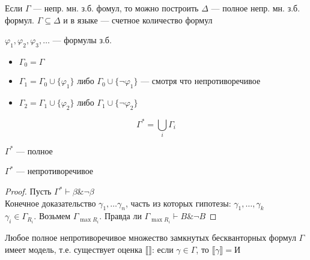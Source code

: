 \documentclass[english]{article}
\begin{document}
\begin{theorem}
	Если \(\Gamma\) --- непр. мн. з.б. фомул, то можно построить \(\Delta\) --- полное непр. мн. з.б. формул. \(\Gamma \subseteq \Delta\) и в языке --- счетное количество формул
	\label{orga418732}
\end{theorem}
\begin{definition}
	\(\varphi_1, \varphi_2, \varphi_3, \dots\) --- формулы з.б. \\
	\begin{itemize}
		\item \(\Gamma_0 = \Gamma\)
		\item \(\Gamma_1 = \Gamma_0 \cup \{\varphi_1\}\) либо \(\Gamma_0 \cup \{\neg \varphi_1\}\) --- смотря что непротиворечивое
		\item \(\Gamma_2 = \Gamma_1 \cup \{\varphi_2\}\) либо \(\Gamma_1 \cup \{\neg \varphi_2\}\)
	\end{itemize}
	\[ \Gamma^* = \bigcup_i \Gamma_i \]
	\label{orgf60f9ad}
\end{definition}
\begin{property}
	\(\Gamma^*\) --- полное
	\label{orgdaeaa27}
\end{property}
\begin{property}
	\(\Gamma^*\) --- непротиворечивое
	\label{org362707c}
\end{property}
\begin{proof}
	Пусть \(\Gamma^* \vdash \beta \& \neg \beta\) \\
	Конечное доказательство \(\gamma_1, \dots \gamma_n\), часть из которых гипотезы: \(\gamma_1, \dots, \gamma_k\) \\
	\(\gamma_i \in \Gamma_{R_i}\). Возьмем \(\Gamma_{\max{R_i}}\). Правда ли \(\Gamma_{\max{R_i}} \vdash B \& \neg B\)
\end{proof}
\begin{theorem}
	Любое полное непротиворечивое множество замкнутых бескванторных формул \(\Gamma\) имеет модель, т.е. существует оценка \(\llbracket \rrbracket\): если \(\gamma \in \Gamma\), то \(\llbracket \gamma \rrbracket = \text{И}\)
	\label{orgaaaaae8}
\end{theorem}
\end{document}
